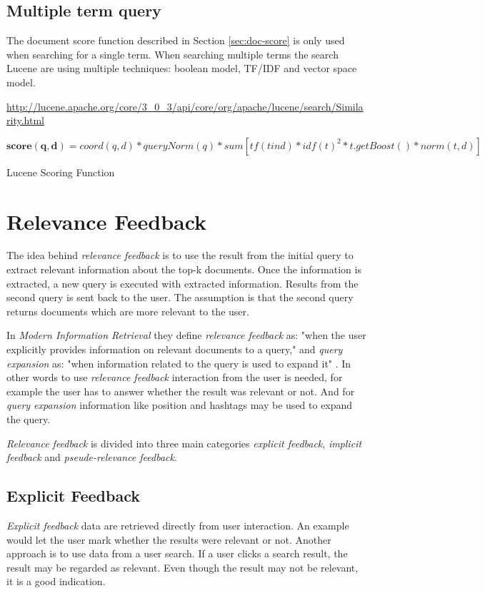 \subsection{Multiple term query}
The document score function described in Section \ref{sec:doc-score} is only used when searching for a single term.
When searching multiple terms the search Lucene are using multiple techniques: boolean model, TF/IDF and vector space model.

\url{http://lucene.apache.org/core/3_0_3/api/core/org/apache/lucene/search/Similarity.html}
\begin{cequation}[H]
	\begin{equation}
		\mathbf{score(q,d)} = coord(q,d) * queryNorm(q) * sum [tf(t in d) * idf(t)^2 * t.getBoost() * norm(t,d)]
	\end{equation}
	\caption{Lucene Scoring Function}
  \label{eq:scoring-function}
\end{cequation}

\section{Relevance Feedback}
The idea behind \textit{relevance feedback} is to use the result from the initial query to extract relevant information about the top-k documents.
Once the information is extracted, a new query is executed with extracted information.
Results from the second query is sent back to the user.
The assumption is that the second query returns documents which are more relevant to the user.

In \textit{Modern Information Retrieval} they define \textit{relevance feedback} as: "when the user explicitly provides information on relevant documents to a query,"
and \textit{query expansion} as: "when information related to the query is used to expand it" \cite[p. 177]{ir-book}.
In other words to use \textit{relevance feedback} interaction from the user is needed, for example the user has to answer whether the result was relevant or not.
And for \textit{query expansion} information like position and hashtags may be used to expand the query.

\textit{Relevance feedback} is divided into three main categories \textit{explicit feedback}, \textit{implicit feedback} and \textit{pseude-relevance feedback}.

\subsection{Explicit Feedback}
\textit{Explicit feedback} data are retrieved directly from user interaction.
An example would let the user mark whether the results were relevant or not.
Another approach is to use data from a user search.
If a user clicks a search result, the result may be regarded as relevant.
Even though the result may not be relevant, it is a good indication.

